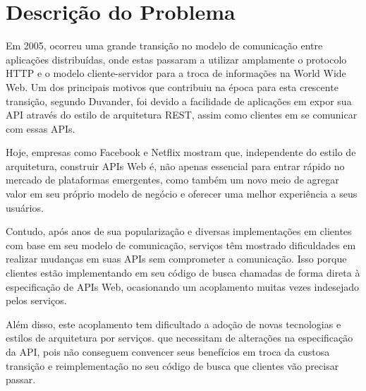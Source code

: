 \section[Descrição do Problema]{Descrição do Problema}

Em 2005, ocorreu uma grande transição no modelo de comunicação entre aplicações distribuídas, onde estas passaram a utilizar amplamente o protocolo HTTP e o modelo cliente-servidor para a troca de informações na World Wide Web. Um dos principais motivos que contribuiu na época para esta crescente transição, segundo Duvander, foi devido a facilidade de aplicações em expor sua API através do estilo de arquitetura REST, assim como clientes em se comunicar com essas APIs. \cite{Duvander2013-2}

Hoje, empresas como Facebook e Netflix mostram que, independente do estilo de arquitetura, construir APIs Web é, não apenas essencial para entrar rápido no mercado de plataformas emergentes, como também um novo meio de agregar valor em seu próprio modelo de negócio e oferecer uma melhor experiência a seus usuários. \cite{Art2016}

Contudo, após anos de sua popularização e diversas implementações em clientes com base em seu modelo de comunicação, serviços têm mostrado dificuldades em realizar mudanças em suas APIs sem comprometer a comunicação. Isso porque clientes estão implementando em seu código de busca chamadas de forma direta à especificação de APIs Web, ocasionando um acoplamento muitas vezes indesejado pelos serviços.

Além disso, este acoplamento tem dificultado a adoção de novas tecnologias e estilos de arquitetura por serviços. que necessitam de alterações na especificação da API, pois não conseguem convencer seus benefícios em troca da custosa transição e reimplementação no seu código de busca que clientes vão precisar passar.
